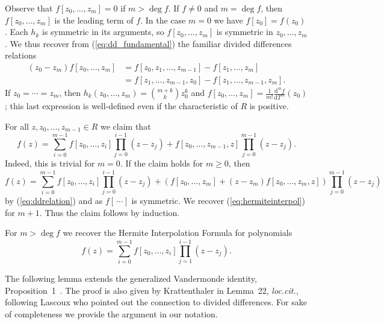 \documentclass[12pt,oneside,a4]{amsart}
\numberwithin{maincounter}{section}
\numberwithin{equation}{section}
\begin{document}
Observe that $f[z_0,\ldots,z_m]=0$ if $m>\deg f$. If $f\not=0$ and
$m=\deg f$, then $f[z_0,\ldots,z_m]$ is the leading term of $f$.
In the case $m=0$ we have $f[z_0]=f(z_0)$. 
Each $h_k$ is symmetric in its arguments, so $f[z_0,\ldots,z_m]$ is
symmetric in $z_0,\ldots,z_m$. We thus recover from
(\ref{eq:dd_fundamental})  the familiar divided
differences relations
\begin{equation}
  \label{eq:ddrelation}
  \begin{aligned}
    (z_0-z_m) f[z_0,\ldots,z_m] &=
    f[z_0,z_1,\ldots,z_{m-1}]-f[z_1,\ldots,z_m]\\
    & = f[z_1,\ldots,z_{m-1},z_0]- f[z_1,\ldots,z_{m-1},z_m].
  \end{aligned}
\end{equation}
If $z_0=\cdots=z_m$, then $h_{k}(z_0,\ldots,z_m) = {m+k\choose
  k}z_0^k$ and $f[z_0,\ldots,z_m] =
\frac{1}{m!}\frac{\mathrm{d}^mf}{\mathrm{d}T^m}(z_0)$; this last
expression  is
well-defined
 even if the characteristic of $R$ is positive. %


For all $z,z_0,\ldots,z_{m-1}\in R$ we claim that
\begin{equation}
  \label{eq:hermiteinterpol}
  f(z) = \sum_{i=0}^{m-1} f[z_0,\ldots,z_i] \prod_{j=0}^{i-1} (z-z_j)
  +f[z_0,\ldots,z_{m-1},z] \prod_{j=0}^{m-1} (z-z_j).
\end{equation}
Indeed, this is trivial for $m=0$. If
 the claim holds for $m\ge 0$, then 
 \begin{equation*}
   f(z) = 
  \sum_{i=0}^{m-1} f[z_0,\ldots,z_i] \prod_{j=0}^{i-1} (z-z_j)
  + (f[z_0,\ldots,z_m]  + (z-z_m)f[z_0,\ldots,z_m,z])
  \prod_{j=0}^{m-1} (z-z_j)
\end{equation*}
by (\ref{eq:ddrelation}) and as $f[\,\cdots]$ is symmetric. We
recover (\ref{eq:hermiteinterpol}) for $m+1$.
Thus the claim follows by induction.

For $m > \deg f$ we recover the
Hermite Interpolation Formula  for polynomials
\begin{equation*}
  f(z) =\sum_{i=0}^{m-1} f[z_0,\ldots,z_i] \prod_{j=1}^{i-1} (z-z_j).
\end{equation*}

The following lemma extends the generalized Vandermonde
identity, Proposition~1~\cite{krattenthaler:adc}. The
proof is also given by Krattenthaler in Lemma~22, \textit{loc.cit.},
following Lascoux who pointed out the connection to divided differences.
For sake of completeness we provide the argument in our notation. 
\end{document}
